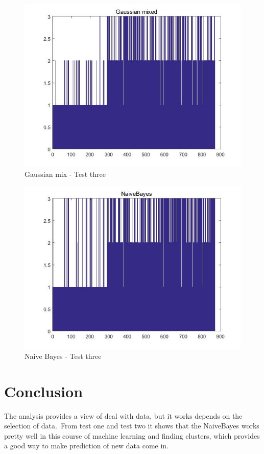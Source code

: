 \documentclass[12pt,letterpaper]{article}
\begin{document}
\begin{figure}[h]
	\centering
	\includegraphics[width=5.0in]{p15}
	\caption{Gaussian mix - Test three}
\end{figure}
\begin{figure}[h]
	\centering
	\includegraphics[width=5.0in]{p14}
	\caption{Naive Bayes - Test three}
\end{figure}

\section{Conclusion}
The analysis provides a view of deal with data, but it works depends on the selection of data.\
From test one and test two it shows that the NaiveBayes works pretty well in this course of machine learning and finding clusters, which provides a good way to make prediction of new data come in.
\end{document}
